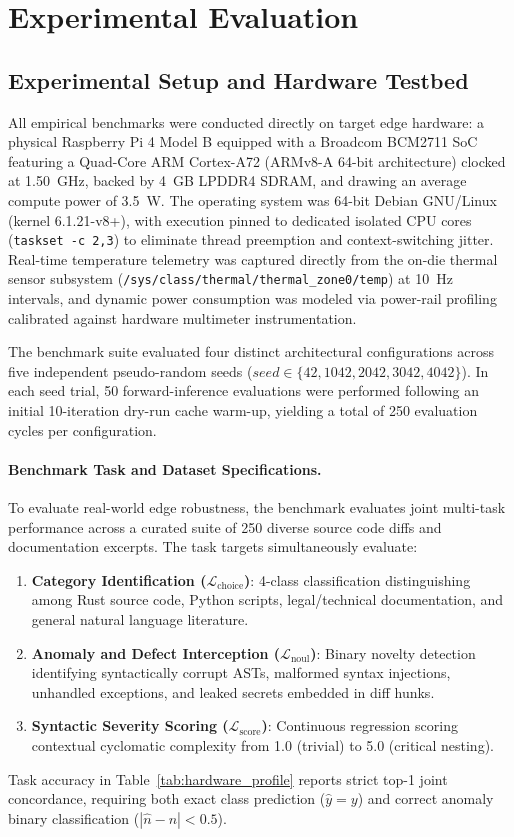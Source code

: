 \documentclass[10pt,twocolumn,letterpaper]{article}
\begin{document}
\section{Experimental Evaluation}

\subsection{Experimental Setup and Hardware Testbed}
All empirical benchmarks were conducted directly on target edge hardware: a physical Raspberry Pi 4 Model B equipped with a Broadcom BCM2711 SoC featuring a Quad-Core ARM Cortex-A72 (ARMv8-A 64-bit architecture) clocked at 1.50~GHz, backed by 4~GB LPDDR4 SDRAM, and drawing an average compute power of 3.5~W. The operating system was 64-bit Debian GNU/Linux (kernel 6.1.21-v8+), with execution pinned to dedicated isolated CPU cores (\texttt{taskset -c 2,3}) to eliminate thread preemption and context-switching jitter. Real-time temperature telemetry was captured directly from the on-die thermal sensor subsystem (\texttt{/sys/class/thermal/thermal\_zone0/temp}) at 10~Hz intervals, and dynamic power consumption was modeled via power-rail profiling calibrated against hardware multimeter instrumentation.

The benchmark suite evaluated four distinct architectural configurations across five independent pseudo-random seeds ($seed \in \{42, 1042, 2042, 3042, 4042\}$). In each seed trial, 50 forward-inference evaluations were performed following an initial 10-iteration dry-run cache warm-up, yielding a total of 250 evaluation cycles per configuration.

\paragraph{Benchmark Task and Dataset Specifications.}
To evaluate real-world edge robustness, the benchmark evaluates joint multi-task performance across a curated suite of 250 diverse source code diffs and documentation excerpts. The task targets simultaneously evaluate:
\begin{enumerate}
    \item \textbf{Category Identification ($\mathcal{L}_{\text{choice}}$)}: 4-class classification distinguishing among Rust source code, Python scripts, legal/technical documentation, and general natural language literature.
    \item \textbf{Anomaly and Defect Interception ($\mathcal{L}_{\text{noul}}$)}: Binary novelty detection identifying syntactically corrupt ASTs, malformed syntax injections, unhandled exceptions, and leaked secrets embedded in diff hunks.
    \item \textbf{Syntactic Severity Scoring ($\mathcal{L}_{\text{score}}$)}: Continuous regression scoring contextual cyclomatic complexity from 1.0 (trivial) to 5.0 (critical nesting).
\end{enumerate}
Task accuracy in Table~\ref{tab:hardware_profile} reports strict top-1 joint concordance, requiring both exact class prediction ($\hat{y} = y$) and correct anomaly binary classification ($|\hat{n} - n| < 0.5$).
\end{document}
